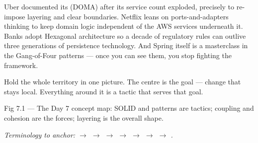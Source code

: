  Uber documented its  (DOMA) after its service count exploded, precisely to re-impose layering and clear boundaries. Netflix leans on ports-and-adapters thinking to keep domain logic independent of the AWS services underneath it. Banks adopt Hexagonal architecture so a decade of regulatory rules can outlive three generations of persistence technology. And Spring itself is a masterclass in the Gang-of-Four patterns --- once you can see them, you stop fighting the framework.


Hold the whole territory in one picture. The centre is the goal --- change that stays local. Everything around it is a tactic that serves that goal.

\begin{wbfigure}{Fig 7.1 — The Day 7 concept map: SOLID and patterns are tactics; coupling and cohesion are the forces; layering is the overall shape.}
\end{wbfigure}

\begin{center}\small\itshape\color{cInk!70}
Terminology to anchor:  $\rightarrow$  $\rightarrow$  $\rightarrow$  $\rightarrow$  $\rightarrow$  $\rightarrow$  $\rightarrow$ .
\end{center}

